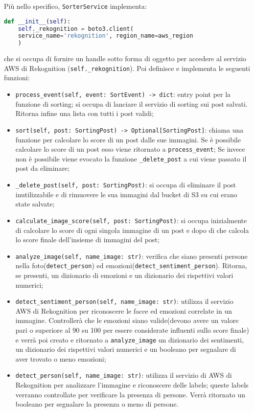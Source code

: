 Più nello specifico, \verb+SorterService+ implementa:
\begin{lstlisting}[language=Python]
    def __init__(self):
    self._rekognition = boto3.client(
    service_name='rekognition', region_name=aws_region
    )
\end{lstlisting} 
che si occupa di fornire un handle sotto forma di oggetto per accedere al servizio AWS di Rekognition
(\verb+self._rekognition+). 
Poi definisce e implementa le seguenti funzioni:
\begin{itemize}
	\item \verb+process_event(self, event: SortEvent) -> dict+: entry point per la funzione di sorting; si occupa di lanciare il servizio di sorting sui post salvati. Ritorna infine una lista con tutti i post validi;
	\item \verb+sort(self, post: SortingPost) -> Optional[SortingPost]+: chiama una funzione per calcolare lo score di un post dalle sue immagini. Se è possibile calcolare lo score di un post esso viene ritornato a \verb+process_event+; Se invece non è possibile viene evocato la funzione \verb+_delete_post+ a cui viene passato il post da eliminare;
	\item \verb+_delete_post(self, post: SortingPost)+: si occupa di eliminare il post inutilizzabile e di rimuovere le sua immagini dal bucket di S3 su cui erano state salvate;
	\item \verb+calculate_image_score(self, post: SortingPost)+: si occupa inizialmente di calcolare lo score di ogni singola immagine di un post e dopo di che calcola lo score finale dell'insieme di immagini del post;
	\item \verb+analyze_image(self, name_image: str)+: verifica che siano presenti persone nella foto(\verb+detect_person+) ed emozioni(\verb+detect_sentiment_person+). Ritorna, se presenti, un dizionario di emozioni e un dizionario dei rispettivi valori numerici;
	\item \verb+detect_sentiment_person(self, name_image: str)+: utilizza il servizio AWS di Rekognition per riconoscere le facce ed emozioni correlate in un immagine. Controllerà che le emozioni siano valide(devono avere un valore pari o superiore al 90 su 100 per essere considerate influenti sullo score finale) e verrà poi creato e ritornato a \verb+analyze_image+ un dizionario dei sentimenti, un dizionario dei rispettivi valori numerici e un booleano per segnalare di aver trovato o meno emozioni;
	\item \verb+detect_person(self, name_image: str)+: utilizza il servizio di AWS di Rekognition per analizzare l'immagine e riconoscere delle labels; queste labels verranno controllate per verificare la presenza di persone. Verrà ritornato un booleano per segnalare la presenza o meno di persone.
\end{itemize}